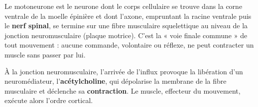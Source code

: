 \documentclass[11pt]{article}
\newcommand{\cle}[1]{{\popxbold\color{popdark}#1}}
\begin{document}
\begin{definition}[Motoneurone]
Le \cle{motoneurone} est le neurone dont le corps cellulaire se trouve dans la corne ventrale de la moelle épinière et dont l'axone, empruntant la racine ventrale puis le \textbf{nerf spinal}, se termine sur une fibre musculaire squelettique au niveau de la \cle{jonction neuromusculaire} (plaque motrice). C'est la « voie finale commune » de tout mouvement : aucune commande, volontaire ou réflexe, ne peut contracter un muscle sans passer par lui.
\end{definition}

À la jonction neuromusculaire, l'arrivée de l'influx provoque la libération d'un neuromédiateur, l'\textbf{acétylcholine}, qui dépolarise la membrane de la fibre musculaire et déclenche sa \textbf{contraction}. Le muscle, \cle{effecteur} du mouvement, exécute alors l'ordre cortical.
\end{document}
